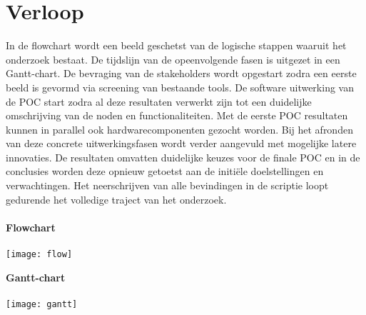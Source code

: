 \documentclass{hogent-article}
\begin{document}
    \section{Verloop}%
    \label{sec:verloop}
    In de flowchart wordt een beeld geschetst van de logische stappen waaruit het onderzoek bestaat. De tijdslijn van de opeenvolgende fasen is uitgezet in een Gantt-chart. De bevraging van de stakeholders wordt opgestart zodra een eerste beeld is gevormd via screening van bestaande tools. De software uitwerking van de POC start zodra al deze resultaten verwerkt zijn tot een duidelijke omschrijving van de noden en functionaliteiten. Met de eerste POC resultaten kunnen in parallel ook hardwarecomponenten gezocht worden. Bij het afronden van deze concrete uitwerkingsfasen wordt verder aangevuld met mogelijke latere innovaties. De resultaten omvatten duidelijke keuzes voor de finale POC en in de conclusies worden deze opnieuw getoetst aan de initiële doelstellingen en verwachtingen. Het neerschrijven van alle bevindingen in de scriptie loopt gedurende het volledige traject van het onderzoek. \\\\
    
    \textbf{Flowchart} \\\\
    \texttt{[image: flow]}
    
    \vspace{5mm}
    
    \textbf{Gantt-chart} \\\\
    \texttt{[image: gantt]}
    
    

    \printbibliography[heading=bibintoc]
\end{document}
